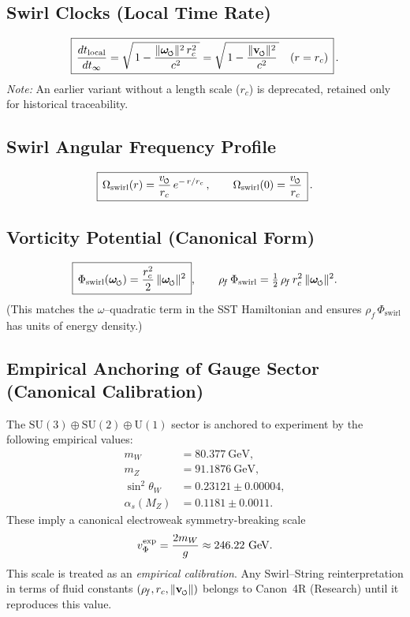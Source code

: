 \documentclass[11pt]{article}
\newcommand{\swirlarrow}{%
     \mathchoice{\mkern-2mu\scriptstyle\boldsymbol{\circlearrowleft}}%
                {\mkern-2mu\scriptstyle\boldsymbol{\circlearrowleft}}%
                {\mkern-2mu\scriptscriptstyle\boldsymbol{\circlearrowleft}}%
                {\mkern-2mu\scriptscriptstyle\boldsymbol{\circlearrowleft}}%
}
\newcommand{\vswirl}{\mathbf{v}_{\swirlarrow}}
\newcommand{\omegas}{\boldsymbol{\omega}_{\swirlarrow}}  %
\newcommand{\vscore}{v_{\swirlarrow}}                    %
\newcommand{\rhof}{\rho_{\!f}}                           %
\newcommand{\rc}{r_c}                                    %
\begin{document}
\subsection*{Swirl Clocks (Local Time Rate)}
    \[
        \boxed{\,\frac{dt_{\text{local}}}{dt_{\infty}}
            = \sqrt{\,1 - \frac{\|\omegas\|^2\,\rc^2}{c^2}\,}
            = \sqrt{\,1 - \frac{\|\vswirl\|^2}{c^2}\,}\quad (r=\rc)\,}\,.
    \]
    \emph{Note:} An earlier variant without a length scale ($\rc$) is deprecated, retained only for historical traceability.

\subsection*{Swirl Angular Frequency Profile}
    \[
        \boxed{\,\Omega_{\text{swirl}}(r) = \frac{\vscore}{\rc}\,e^{-\,r/\rc}\,,\qquad \Omega_{\text{swirl}}(0)=\frac{\vscore}{\rc}\,}\,.
    \]

\subsection*{Vorticity Potential (Canonical Form)}
    \[
        \boxed{\,\Phi_{\text{swirl}}(\omegas)=\frac{\rc^{2}}{2}\,\|\omegas\|^{2}\,},\qquad
        \rhof\,\Phi_{\text{swirl}}=\tfrac12\,\rhof\,\rc^{2}\,\|\omegas\|^{2}.
    \]
    (This matches the $\omega$–quadratic term in the SST Hamiltonian and ensures $\rhof\,\Phi_{\text{swirl}}$ has units of energy density.)

\subsection{Empirical Anchoring of Gauge Sector (Canonical Calibration)}
The $\mathrm{SU}(3)\oplus \mathrm{SU}(2)\oplus \mathrm{U}(1)$ sector is anchored to experiment by the
following empirical values:
\begin{align}
	m_W &= 80.377~\mathrm{GeV}, \\
	m_Z &= 91.1876~\mathrm{GeV}, \\
	\sin^2\theta_W &= 0.23121 \pm 0.00004, \\
	\alpha_s(M_Z) &= 0.1181 \pm 0.0011 .
\end{align}
These imply a canonical electroweak symmetry-breaking scale
\begin{equation}
	v_\Phi^{\rm exp} = \frac{2 m_W}{g} \approx 246.22~\mathrm{GeV}.
\end{equation}
This scale is treated as an \emph{empirical calibration}. Any Swirl--String reinterpretation
in terms of fluid constants $(\rho_{\!f}, r_c, \lVert \vswirl \rVert)$ belongs to
Canon~4R (Research) until it reproduces this value.
\end{document}
